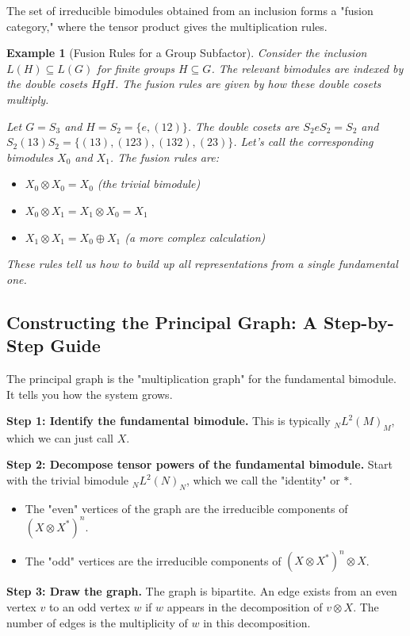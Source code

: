 \documentclass[11pt, a4paper]{article}
\theoremstyle{colored_def}
\theoremstyle{colored_thm}
\theoremstyle{colored_ex}
\newtheorem{example}{Example}[section]
\begin{document}
The set of irreducible bimodules obtained from an inclusion forms a "fusion category," where the tensor product gives the multiplication rules.

\begin{example}[Fusion Rules for a Group Subfactor]
Consider the inclusion $L(H) \subseteq L(G)$ for finite groups $H \subseteq G$. The relevant bimodules are indexed by the double cosets $HgH$. The fusion rules are given by how these double cosets multiply.

Let $G = S_3$ and $H = S_2 = \{e, (12)\}$. The double cosets are $S_2 e S_2 = S_2$ and $S_2(13)S_2 = \{ (13), (123), (132), (23) \}$. Let's call the corresponding bimodules $X_0$ and $X_1$. The fusion rules are:
\begin{itemize}
    \item $X_0 \otimes X_0 = X_0$ (the trivial bimodule)
    \item $X_0 \otimes X_1 = X_1 \otimes X_0 = X_1$
    \item $X_1 \otimes X_1 = X_0 \oplus X_1$ (a more complex calculation)
\end{itemize}
These rules tell us how to build up all representations from a single fundamental one.
\end{example}

\subsection{Constructing the Principal Graph: A Step-by-Step Guide}

The principal graph is the "multiplication graph" for the fundamental bimodule. It tells you how the system grows.

\textbf{Step 1: Identify the fundamental bimodule.}
This is typically $_N L^2(M)_M$, which we can just call $X$.

\textbf{Step 2: Decompose tensor powers of the fundamental bimodule.}
Start with the trivial bimodule $_N L^2(N)_N$, which we call the "identity" or $*$.
\begin{itemize}
    \item The "even" vertices of the graph are the irreducible components of $(X \otimes X^*)^n$.
    \item The "odd" vertices are the irreducible components of $(X \otimes X^*)^n \otimes X$.
\end{itemize}

\textbf{Step 3: Draw the graph.}
The graph is bipartite. An edge exists from an even vertex $v$ to an odd vertex $w$ if $w$ appears in the decomposition of $v \otimes X$. The number of edges is the multiplicity of $w$ in this decomposition.
\end{document}
